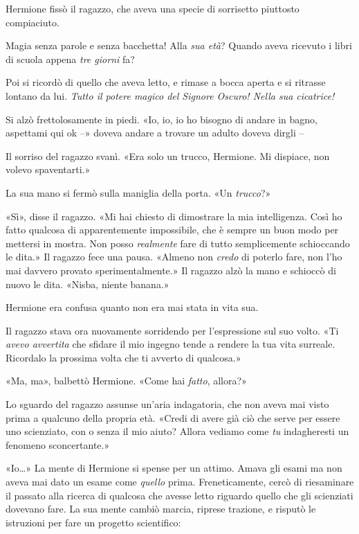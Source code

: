 Hermione fissò il ragazzo, che aveva una specie di sorrisetto piuttosto compiaciuto.

Magia senza parole e senza bacchetta! Alla \textit{sua età}? Quando aveva ricevuto i libri di scuola appena \textit{tre giorni} fa?

Poi si ricordò di quello che aveva letto, e rimase a bocca aperta e si ritrasse lontano da lui. \textit{Tutto il potere magico del Signore Oscuro! Nella sua cicatrice!}

Si alzò frettolosamente in piedi. «Io, io, io ho bisogno di andare in bagno, aspettami qui ok –» doveva andare a trovare un adulto doveva dirgli –

Il sorriso del ragazzo svanì. «Era solo un trucco, Hermione. Mi dispiace, non volevo spaventarti.»

La sua mano si fermò sulla maniglia della porta. «Un \textit{trucco}?»

«Sì», disse il ragazzo. «Mi hai chiesto di dimostrare la mia intelligenza. Così ho fatto qualcosa di apparentemente impossibile, che è sempre un buon modo per mettersi in mostra. Non posso \textit{realmente} fare di tutto semplicemente schioccando le dita.» Il ragazzo fece una pausa. «Almeno non \textit{credo} di poterlo fare, non l’ho mai davvero provato sperimentalmente.» Il ragazzo alzò la mano e schioccò di nuovo le dita. «Nisba, niente banana.»

Hermione era confusa quanto non era mai stata in vita sua.

Il ragazzo stava ora nuovamente sorridendo per l’espressione sul suo volto. «Ti \textit{avevo avvertita} che sfidare il mio ingegno tende a rendere la tua vita surreale. Ricordalo la prossima volta che ti avverto di qualcosa.»

«Ma, ma», balbettò Hermione. «Come hai \textit{fatto}, allora?»

Lo sguardo del ragazzo assunse un’aria indagatoria, che non aveva mai visto prima a qualcuno della propria età. «Credi di avere già ciò che serve per essere uno scienziato, con o senza il mio aiuto? Allora vediamo come \textit{tu} indagheresti un fenomeno sconcertante.»

«Io…» La mente di Hermione si spense per un attimo. Amava gli esami ma non aveva mai dato un esame come \textit{quello} prima. Freneticamente, cercò di riesaminare il passato alla ricerca di qualcosa che avesse letto riguardo quello che gli scienziati dovevano fare. La sua mente cambiò marcia, riprese trazione, e risputò le istruzioni per fare un progetto scientifico:

